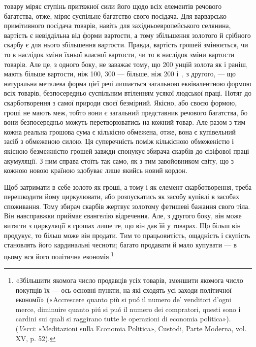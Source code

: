 \parcont{}  %
товару міряє ступінь притяжної сили його щодо всіх елементів
речового багатства, отже, міряє суспільне багатство свого посідача.
Для варварсько-примітивного посідача товарів, навіть
для західньоевропейського селянина, вартість є невіддільна від
форми вартости, а тому збільшення золотого й срібного скарбу
є для нього збільшення вартости. Правда, вартість грошей змінюється,
чи то в наслідок зміни їхньої власної вартости, чи то
в наслідок зміни вартости товарів. Але це, з одного боку, не
заважає тому, що 200 унцій золота як і раніш, мають більше
вартости, ніж 100, 300 — більше, ніж 200 і~, з другого, —
що натуральна металева форма цієї речі лишається загальною
еквівалентною формою всіх товарів, безпосередньо суспільним
втіленням усякої людської праці. Потяг до скарботворення з
самої природи своєї безмірний. Якісно, або своєю формою, гроші
не мають меж, тобто вони є загальний представник речового
багатства, бо вони безпосередньо можуть перетворюватись на
кожний товар. Але разом з тим кожна реальна грошова сума є
кількісно обмежена, отже, вона є купівельний засіб з обмеженою
силою. Ця суперечність поміж кількісною обмеженістю і якісною
безмежністю грошей завжди спонукує збирача скарбів до сізіфової
праці акумуляції. З ним справа стоїть так само, як з
тим завойовником світу, що з кожною новою країною здобуває
лише якийсь новий кордон.

Щоб затримати в себе золото як гроші, а тому і як елемент
скарботворення, треба перешкодити йому циркулювати, або розпускатись
як засобу купівлі в засобах споживання. Тому збирач
скарбів жертвує золотому фетишеві бажання свого тіла.
Він навсправжки приймає євангелію відречення. Але, з другого
боку, він може витягти з циркуляції в грошах лише те, що він
дав їй у товарах. Що більш він продукує, то більш може він
продати. Тим то працьовитість, ощадність і скупість становлять
його кардинальні чесноти; багато продавати й мало купувати —
в цьому вся його політична економія.\footnote{«Збільшити якомога число продавців усіх товарів, зменшити якомога
число покупців їх — ось основні пункти, на які сходять усі заходи
політичної економії» («Accrescere quanto più si puó il numero de’ venditori
d’ogni merce, diminuire quanto piú si puó il numero dei compratori, questi
sono і cardini sui quali si raggirano tutte le operazioni di economia politica»).
(\emph{Verri}: «Meditazioni sulla Economia Politica», Custodi, Parte Moderna,
vol. XV, p. 52).}

